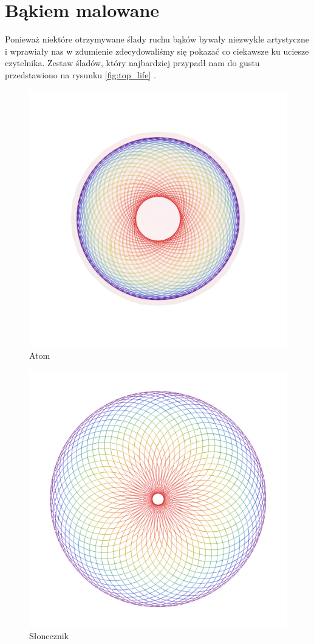 \chapter{Bąkiem malowane}

Ponieważ niektóre otrzymywane ślady ruchu bąków bywały niezwykle artystyczne i wprawiały nas w zdumienie zdecydowaliśmy się pokazać co ciekawsze ku uciesze czytelnika. Zestaw śladów, który najbardziej przypadł nam do gustu przedstawiono na rysunku \ref{fig:top_life} \cite{Joniak}.
\begin{figure}[tp]
  \centering
  \includegraphics[scale=0.7]{figures/chapter_06/mal2.pdf}
  \caption{Atom}
\end{figure}
%
\begin{figure}[tp]
  \centering
  \includegraphics[scale=0.5]{figures/chapter_06/mal4.pdf}
  \caption{Słonecznik}
\end{figure}
